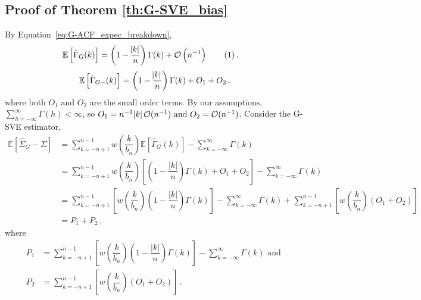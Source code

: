 \documentclass[11pt]{article}
\newcommand{\Var}{\text{Var}}
\newcommand\numberthis{\addtocounter{equation}{1}\tag{\theequation}}
\theoremstyle{remark}
\begin{document}
\subsection{Proof of Theorem \ref{th:G-SVE_bias}}

By Equation~\ref{eq:G-ACF_expec_breakdown},
\begin{align*}
\mathbb{E} \left[\hat{\Gamma}_{G}(k) \right]
& = \left(1 - \dfrac{\abs{k}}{n}\right)\Gamma(k) + \mathcal{O} \left(n^{-1} \right)  \numberthis \label{eq:G-_bias2}  \,.
\end{align*}
%
\begin{equation} \label{eq:G-_bias2}
\mathbb{E} \left[\hat{\Gamma}_{G-}(k) \right] = \left(1 - \dfrac{\abs{k}}{n}\right)\Gamma(k) + O_1 + O_2    \,.
\end{equation}
%
where both $O_1 \textrm{ and } O_2$ are the small order terms. By our assumptions, $\sum_{h=-\infty}^{\infty}\Gamma(h) < \infty$, so $O_1 = n^{-1}\abs{k} \mathcal{O}(n^{-1}) \text{ and } O_2 = \mathcal{O}(n^{-1})$.  
Consider the G-SVE estimator,
\begin{align*}
 \mathbb{E} \left[\hat{\Sigma}_{G} - \Sigma \right] & = \sum_{k=-n+1}^{n-1} w\left(\dfrac{k}{b_n}\right)\mathbb{E} \left[\hat{\Gamma}_{G}(k) \right] - \sum_{k=-\infty}^{\infty}\Gamma(k)\\
    &= \sum_{k=-n+1}^{n-1}  w\left(\dfrac{k}{b_n}\right)\left[\left(1-\dfrac{|k|}{n}\right)\Gamma(k) + O_1 + O_2 \right]  - \sum_{k=-\infty}^{\infty}\Gamma(k)\\
    &= \sum_{k=-n+1}^{n-1} \left[ w\left(\dfrac{k}{b_n}\right)\left(1-\dfrac{|k|}{n}\right)\Gamma(k)\right]  - \sum_{k=-\infty}^{\infty}\Gamma(k) + \sum_{k=-n+1}^{n-1}\left[  w\left(\dfrac{k}{b_n}\right)  (O_1 + O_2) \right] \\ 
    & = P_1 + P_2\,,
\end{align*}
%
where 
\begin{align*}
    P_1 &= \sum\limits_{k=-n+1}^{n-1}\left[w\left(\dfrac{k}{b_n}\right)\left(1-\dfrac{|k|}{n}\right)\Gamma(k) \right] - \sum\limits_{k=-\infty}^{\infty}\Gamma(k) \textrm{ and }\\   
    P_2 &= \sum_{k=-n+1}^{n-1}\left[  w\left(\dfrac{k }{b_n}\right)\left(O_1 + O_2\right)\right]\,.
\end{align*}
\end{document}
